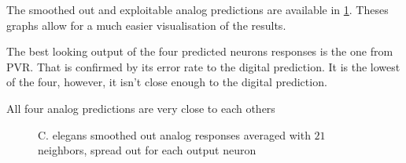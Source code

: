 The smoothed out and exploitable analog predictions are available in \cref{graph:smooth5Celegans}. Theses graphs allow for a much easier visualisation of the results.

The best looking output of the four predicted neurons responses is the one from PVR. That is confirmed by its error rate to the digital prediction. It is the lowest of the four, however, it isn't close enough to the digital prediction.

All four analog predictions are very close to each others

\begin{figure}[H]
  \centering
  \begin{minipage}{\columnwidth}
    \hfill
  \end{minipage}
  \begin{minipage}{\columnwidth}
    \hfill
  \end{minipage}
  \caption{\ac{C. elegans} smoothed out analog responses averaged with $21$ neighbors, spread out for each output neuron}
  \label{graph:smooth5Celegans}
\end{figure}

